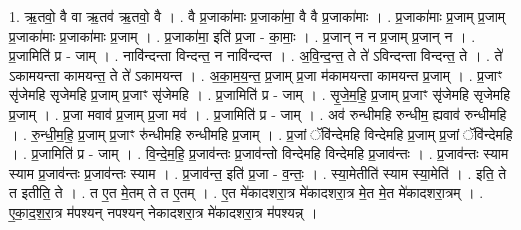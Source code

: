 \documentclass[17pt]{extarticle}
\begin{document}
1. ऋ॒तवो॒ वै वा ऋ॒तव॑ ऋ॒तवो॒ वै । . वै प्र॒जाका॑माः प्र॒जाका॑मा॒ वै वै प्र॒जाका॑माः । . प्र॒जाका॑माः प्र॒जाम् प्र॒जाम् प्र॒जाका॑माः प्र॒जाका॑माः प्र॒जाम् । . प्र॒जाका॑मा॒ इति॑ प्र॒जा - का॒माः॒ । . प्र॒जान् न न प्र॒जाम् प्र॒जान् न । . प्र॒जामिति॑ प्र - जाम् । . नावि॑न्दन्ता विन्दन्त॒ न नावि॑न्दन्त । . अ॒वि॒न्द॒न्त॒ ते ते॑ ऽविन्दन्ता विन्दन्त॒ ते । . ते॑ ऽकामयन्ता कामयन्त॒ ते ते॑ ऽकामयन्त । . अ॒का॒म॒य॒न्त॒ प्र॒जाम् प्र॒जा म॑कामयन्ता कामयन्त प्र॒जाम् । . प्र॒जाꣳ सृ॑जेमहि सृजेमहि प्र॒जाम् प्र॒जाꣳ सृ॑जेमहि । . प्र॒जामिति॑ प्र - जाम् । . सृ॒जे॒म॒हि॒ प्र॒जाम् प्र॒जाꣳ सृ॑जेमहि सृजेमहि प्र॒जाम् । . प्र॒जा मवाव॑ प्र॒जाम् प्र॒जा मव॑ । . प्र॒जामिति॑ प्र - जाम् । . अव॑ रुन्धीमहि रुन्धीम॒ ह्यवाव॑ रुन्धीमहि । . रु॒न्धी॒म॒हि॒ प्र॒जाम् प्र॒जाꣳ रु॑न्धीमहि रुन्धीमहि प्र॒जाम् । . प्र॒जां ॅवि॑न्देमहि विन्देमहि प्र॒जाम् प्र॒जां ॅवि॑न्देमहि । . प्र॒जामिति॑ प्र - जाम् । . वि॒न्दे॒म॒हि॒ प्र॒जाव॑न्तः प्र॒जाव॑न्तो विन्देमहि विन्देमहि प्र॒जाव॑न्तः । . प्र॒जाव॑न्तः स्याम स्याम प्र॒जाव॑न्तः प्र॒जाव॑न्तः स्याम । . प्र॒जाव॑न्त॒ इति॑ प्र॒जा - व॒न्तः॒ । . स्या॒मेतीति॑ स्याम स्या॒मेति॑ । . इति॒ ते त इतीति॒ ते । . त ए॒त मे॒तम् ते त ए॒तम् । . ए॒त मे॑कादशरा॒त्र मे॑कादशरा॒त्र मे॒त मे॒त मे॑कादशरा॒त्रम् । . ए॒का॒द॒श॒रा॒त्र म॑पश्यन् नपश्यन् नेकादशरा॒त्र मे॑कादशरा॒त्र म॑पश्यन्न् । \newline
\end{document}
